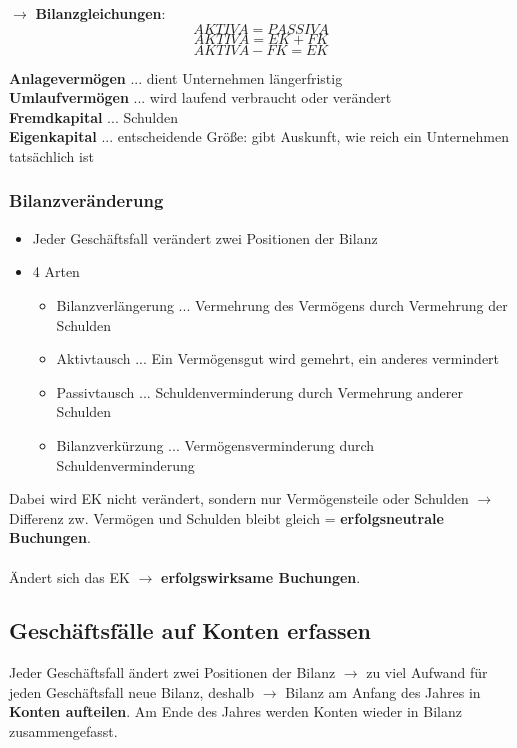 \documentclass[a4paper, ngerman]{article}
\begin{document}
$\rightarrow$ \textbf{Bilanzgleichungen}:
$$
    AKTIVA=PASSIVA
$$
$$
    AKTIVA=EK+FK
$$
$$
    AKTIVA-FK=EK
$$

\noindent \textbf{Anlagevermögen} ... dient Unternehmen längerfristig \\
\textbf{Umlaufvermögen} ... wird laufend verbraucht oder verändert \\
\textbf{Fremdkapital} ... Schulden \\
\textbf{Eigenkapital} ... entscheidende Größe: gibt Auskunft, wie reich ein Unternehmen tatsächlich ist

\subsubsection{Bilanzveränderung}
\begin{itemize}
    \item Jeder Geschäftsfall verändert zwei Positionen der Bilanz
    \item 4 Arten
          \begin{itemize}
              \item Bilanzverlängerung ... Vermehrung des Vermögens durch Vermehrung der Schulden
              \item Aktivtausch ... Ein Vermögensgut wird gemehrt, ein anderes vermindert
              \item Passivtausch ... Schuldenverminderung durch Vermehrung anderer Schulden
              \item Bilanzverkürzung ... Vermögensverminderung durch Schuldenverminderung
          \end{itemize}
\end{itemize}
Dabei wird EK nicht verändert, sondern nur Vermögensteile oder Schulden
$\rightarrow$ Differenz zw. Vermögen und Schulden bleibt gleich
= \textbf{erfolgsneutrale Buchungen}. \\ \\
\noindent
Ändert sich das EK $\rightarrow$ \textbf{erfolgswirksame Buchungen}.
\subsection{Geschäftsfälle auf Konten erfassen}
Jeder Geschäftsfall ändert zwei Positionen der Bilanz $\rightarrow$ zu viel Aufwand für jeden Geschäftsfall neue Bilanz, deshalb
$\rightarrow$ Bilanz am Anfang des Jahres in \textbf{Konten aufteilen}. Am Ende des Jahres werden Konten wieder in Bilanz zusammengefasst.
\end{document}
